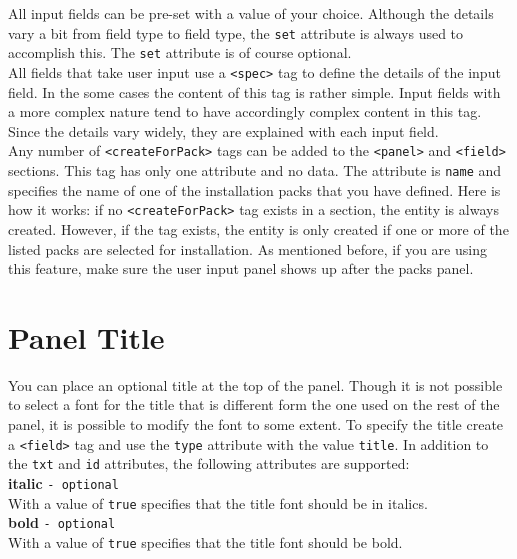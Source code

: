 All input fields can be pre-set with a value of your choice. Although
the details vary a bit from field type to field type, the \texttt{set}
attribute is always used to accomplish this. The \texttt{set} attribute
is of course optional.\\

All fields that take user input use a \texttt{<spec>} tag to define the
details of the input field. In the some cases the content of this tag is
rather simple. Input fields with a more complex nature tend to have
accordingly complex content in this tag. Since the details vary widely,
they are explained with each input field.\\

Any number of \texttt{<createForPack>} tags can be added to the
\texttt{<panel>} and \texttt{<field>} sections. This tag has only one
attribute and no data. The attribute is \texttt{name} and specifies the
name of one of the installation packs that you have defined. Here is how
it works: if no \texttt{<createForPack>} tag exists in a section, the
entity is always created. However, if the tag exists, the entity is only
created if one or more of the listed packs are selected for
installation. As mentioned before, if you are using this feature, make
sure the user input panel shows up after the packs panel.\\

\section{Panel Title}

You can place an optional title at the top of the panel. Though it is
not possible to select a font for the title that is different form the
one used on the rest of the panel, it is possible to modify the font to
some extent. To specify the title create a \texttt{<field>} tag and use
the \texttt{type} attribute with the value \texttt{title}. In addition
to the \texttt{txt} and \texttt{id} attributes, the following attributes
are supported:\\

\textbf{italic} \texttt{- optional}\\

With a value of \texttt{true} specifies that the title font should be in italics.\\

\textbf{bold} \texttt{- optional}\\

With a value of \texttt{true} specifies that the title font should be bold.\\

